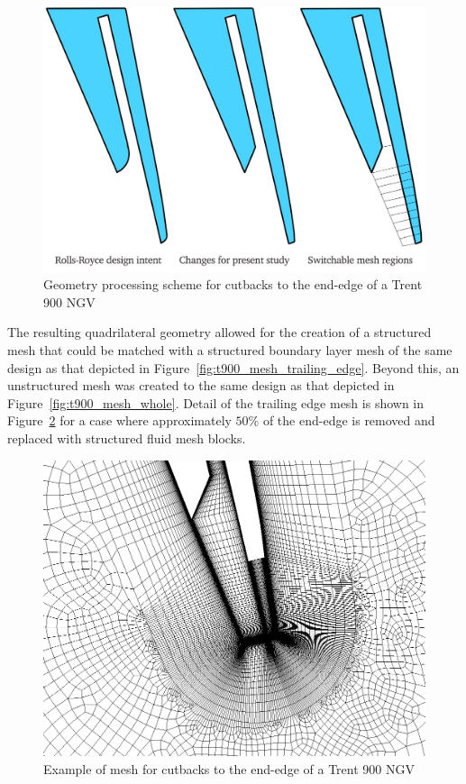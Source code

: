 \documentclass[a4paper, 11pt, oneside]{report}
\begin{document}
\begin{figure}[H]
      \centering
      \includegraphics[width=.9\textwidth]{figs/T900_ss_cutbacks_geometry.png}
      \caption{Geometry processing scheme for cutbacks to the end-edge of a Trent 900 NGV}
      \label{fig:T900_ss_cutbacks_geometry}
\end{figure}

The resulting quadrilateral geometry allowed for the creation of a structured mesh that could be matched with a structured boundary layer mesh of the same design as that depicted in Figure~\ref{fig:t900_mesh_trailing_edge}. Beyond this, an unstructured mesh was created to the same design as that depicted in Figure~\ref{fig:t900_mesh_whole}. Detail of the trailing edge mesh is shown in Figure~\ref{fig:T900_ss_cutbacks_mesh} for a case where approximately $50\%$ of the end-edge is removed and replaced with structured fluid mesh blocks.

\begin{figure}[H]
      \centering
      \includegraphics[width=.9\textwidth]{figs/T900_ss_cutbacks_mesh.png}
      \caption{Example of mesh for cutbacks to the end-edge of a Trent 900 NGV}
      \label{fig:T900_ss_cutbacks_mesh}
\end{figure}
\end{document}
